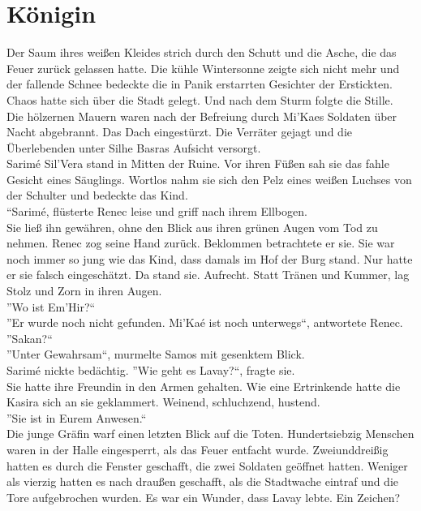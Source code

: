 \chapter{Königin}

Der Saum ihres weißen Kleides strich durch den Schutt und die Asche, die das Feuer zurück gelassen 
hatte. Die kühle Wintersonne zeigte sich nicht mehr und der fallende Schnee bedeckte die in Panik erstarrten Gesichter der Erstickten. Chaos hatte 
sich über die Stadt gelegt. Und nach dem Sturm folgte die Stille.\\
Die hölzernen Mauern waren nach der Befreiung durch Mi'Kaes Soldaten über Nacht abgebrannt. Das 
Dach eingestürzt. Die Verräter gejagt und die Überlebenden unter Silhe Basras Aufsicht versorgt.\\
Sarimé Sil'Vera stand in Mitten der Ruine. Vor ihren Füßen sah sie das fahle Gesicht eines 
Säuglings. Wortlos nahm sie sich den Pelz eines weißen Luchses von der Schulter und bedeckte das 
Kind.\\
``Sarimé, flüsterte Renec leise und griff nach ihrem Ellbogen.\\
Sie ließ ihn gewähren, ohne den Blick aus ihren grünen Augen vom Tod zu nehmen. Renec zog seine 
Hand zurück. Beklommen betrachtete er sie. Sie war noch immer so jung wie das Kind, dass damals im 
Hof der Burg stand. Nur hatte er sie falsch eingeschätzt. Da stand sie. Aufrecht. Statt Tränen und 
Kummer, lag Stolz und Zorn in ihren Augen.\\
''Wo ist Em'Hir?``\\
''Er wurde noch nicht gefunden. Mi'Kaé ist noch unterwegs``, antwortete Renec.\\
''Sakan?``\\
''Unter Gewahrsam``, murmelte Samos mit gesenktem Blick.\\
Sarimé nickte bedächtig. ''Wie geht es Lavay?``, fragte sie.\\
Sie hatte ihre Freundin in den Armen gehalten. Wie eine Ertrinkende hatte die Kasira sich an sie 
geklammert. Weinend, schluchzend, hustend.\\
''Sie ist in Eurem Anwesen.``\\
Die junge Gräfin warf einen letzten Blick auf die Toten. Hundertsiebzig Menschen waren in der Halle 
eingesperrt, als das Feuer entfacht wurde. Zweiunddreißig hatten es durch die Fenster geschafft, die 
zwei Soldaten geöffnet hatten. Weniger als vierzig hatten es nach draußen geschafft, als die Stadtwache eintraf und die Tore 
aufgebrochen wurden. Es war ein Wunder, dass Lavay lebte. Ein Zeichen?\\


